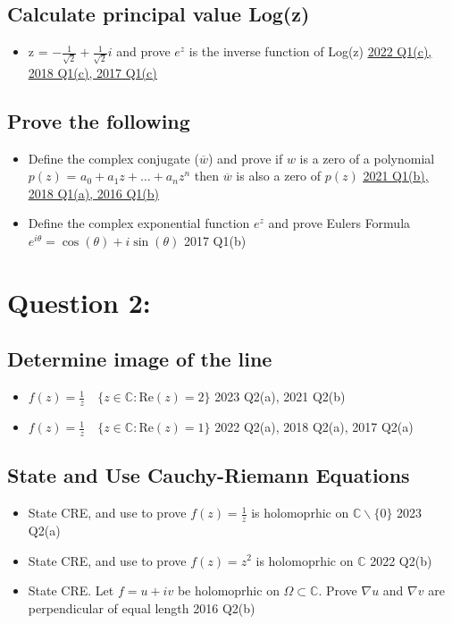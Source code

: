 \documentclass[a4paper, 8pt]{extarticle}
\begin{document}
\subsection{Calculate principal value Log(z)}
\begin{itemize}
	\item z = $-\frac{1}{\sqrt{2}} + \frac{1}{\sqrt{2}} i$ and prove $e^z$ is the inverse function of Log(z) \hfill \hyperref[sol:2022Q1c]{\uline{2022 Q1(c), 2018 Q1(c), 2017 Q1(c)}}
\end{itemize}
\subsection{Prove the following}
\begin{itemize}
	\item Define the complex conjugate ($\overline{w}$) and prove if $w$ is a zero of a polynomial $p(z)$ = $a_0 + a_1 z + \ldots + a_n z^n$ then $\overline{w}$ is also a zero of $p(z)$ \hfill \hyperref[sol:2021Q1b]{\uline{2021 Q1(b), 2018 Q1(a), 2016 Q1(b)}}
	\item Define the complex exponential function $e^z$ and prove Eulers Formula $e^{i \theta} = \cos(\theta) + i \sin(\theta)$ \hfill 2017 Q1(b)
\end{itemize}





\pagebreak


\section{Question 2: }
\subsection{Determine image of the line}
\begin{itemize}
	\item $f(z) = \frac{1}{z} \quad \{z \in \mathbb{C}: \text{Re}(z) = 2\}$ \hfill 2023 Q2(a), 2021 Q2(b)
	\item $f(z) = \frac{1}{z} \quad \{z \in \mathbb{C}: \text{Re}(z) = 1\}$ \hfill 2022 Q2(a), 2018 Q2(a), 2017 Q2(a)
\end{itemize}
\subsection{State and Use Cauchy-Riemann Equations}
\begin{itemize}
	\item State CRE, and use to prove $f(z) = \frac{1}{z}$ is holomoprhic on $\mathbb{C} \backslash \{0\}$ \hfill 2023 Q2(a)
	\item State CRE, and use to prove $f(z) = z^2$ is holomoprhic on $\mathbb{C}$ \hfill 2022 Q2(b)
	\item State CRE. Let $f = u+iv$ be holomoprhic on $\Omega \subset \mathbb{C}$. Prove $\nabla u$ and $\nabla v$ are perpendicular of equal length \hfill 2016 Q2(b)
\end{itemize}
\end{document}
